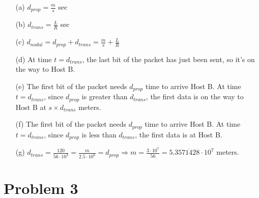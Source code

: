 \documentclass[12pt,a4paper]{article}
\begin{document}
\begin{enumerate}
    \item [(a)] 
        $d_{prop} = \frac{m}{s} $ sec
    \item[(b)]
        $d_{trans} = \frac{L}{R}$ sec
    \item[(c)]
        $d_{nodal} = d_{prop} + d_{trans} = \frac{m}{s} + \frac{L}{R}$
    \item[(d)]
        At time $t = d_{trans}$, the last bit of the packet has just been sent, so it's on the way to Host B.
    \item[(e)]
        The first bit of the packet needs $d_{prop}$ time to arrive Host B.
        At time $t = d_{trans}$, since $d_{prop}$ is greater than $d_{trans}$, the first data is on the way to Host B at $s\times d_{trans}$ meters.
    \item[(f)]
        The first bit of the packet needs $d_{prop}$ time to arrive Host B.
        At time $t = d_{trans}$, since $d_{prop}$ is less than $d_{trans}$, the first data is at Host B.
    \item[(g)] 
        $d_{trans} = \frac{120}{56\cdot 10^{3}} = \frac{m}{2.5\cdot  10^{8}} = d_{prop} \Rightarrow m = \frac{3\cdot 10^{7}}{56} = 5.3\overline{571428}\cdot 10^{7}$ meters.

\end{enumerate}

\section*{Problem 3}    
\end{document}
